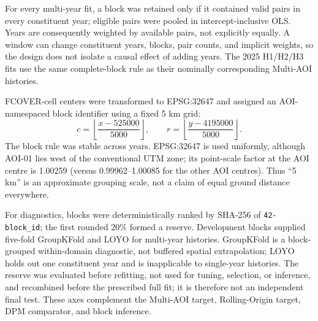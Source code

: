 For every multi-year fit, a block was retained only if it contained valid pairs in every constituent year; eligible pairs were pooled in intercept-inclusive OLS. Years are consequently weighted by available pairs, not explicitly equally. A window can change constituent years, blocks, pair counts, and implicit weights, so the design does not isolate a causal effect of adding years. The 2025 H1/H2/H3 fits use the same complete-block rule as their nominally corresponding Multi-AOI histories.

FCOVER-cell centers were transformed to EPSG:32647 and assigned an AOI-namespaced block identifier using a fixed 5 km grid:
\begin{equation}
c=\left\lfloor\frac{x-525000}{5000}\right\rfloor,\qquad
r=\left\lfloor\frac{y-4195000}{5000}\right\rfloor.
\end{equation}
The block rule was stable across years. EPSG:32647 is used uniformly, although AOI-01 lies west of the conventional UTM zone; its point-scale factor at the AOI centre is 1.00259 (versus 0.99962--1.00085 for the other AOI centres). Thus ``5 km'' is an approximate grouping scale, not a claim of equal ground distance everywhere.

For diagnostics, blocks were deterministically ranked by SHA-256 of \texttt{42-block\_id}; the first rounded 20\% formed a reserve. Development blocks supplied five-fold GroupKFold and LOYO for multi-year histories. GroupKFold is a block-grouped within-domain diagnostic, not buffered spatial extrapolation; LOYO holds out one constituent year and is inapplicable to single-year histories. The reserve was evaluated before refitting, not used for tuning, selection, or inference, and recombined before the prescribed full fit; it is therefore not an independent final test. These axes complement the Multi-AOI target, Rolling-Origin target, DPM comparator, and block inference.

